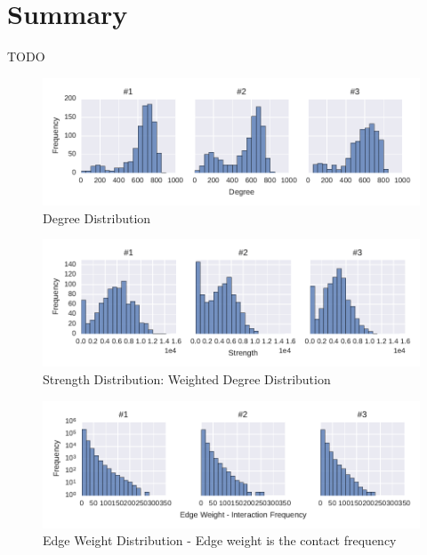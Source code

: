 \section{Summary}
TODO




\begin{figure}[htb]
	\centering
	\includegraphics[width=1.0\textwidth]{Figures/stat-degreeDist}
	\caption[Degree Distribution]{Degree Distribution}
	\label{fig:statDegreeDist}
\end{figure}


\begin{figure}[htb]
	\centering
	\includegraphics[width=1.0\textwidth]{Figures/stat-strengthDist}
	\caption[Strength Distribution]{Strength Distribution: Weighted Degree Distribution}
	\label{fig:statStrengthDist}
\end{figure}

\begin{figure}[htb]
	\centering
	\includegraphics[width=1.0\textwidth]{Figures/stat-edgeWeightDist}
	\caption[Edge Weight Distribution]{Edge Weight Distribution - Edge weight is the contact frequency}
	\label{fig:statEdgeWeightDist}
\end{figure}



